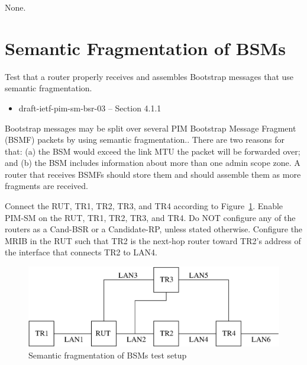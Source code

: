 \documentclass[11pt]{report}
\begin{document}
None.

\newpage
\section{Semantic Fragmentation of BSMs}

Test that a router properly receives and assembles Bootstrap messages that use
semantic fragmentation.


\begin{itemize}
  \item draft-ietf-pim-sm-bsr-03 -- Section 4.1.1
\end{itemize}

Bootstrap messages may be split over several PIM Bootstrap Message Fragment
(BSMF) packets by using semantic fragmentation.. There are two reasons for
that: (a) the BSM would exceed the link MTU the packet will be forwarded over;
and (b) the BSM includes information about more than one admin scope zone.
A router that receives BSMFs should store them and should assemble them as
more fragments are received.

Connect the RUT, TR1, TR2, TR3, and TR4 according to
Figure~\ref{fig:pim_test_6_7_semantic_fragmentation_of_bsms}.
Enable PIM-SM on the RUT, TR1, TR2, TR3, and TR4.
Do NOT configure any of the routers as a Cand-BSR or a Candidate-RP,
unless stated otherwise.
Configure the MRIB in the RUT such that TR2 is the next-hop router toward
TR2's address of the interface that connects TR2 to LAN4.


\begin{figure}[htbp]
  \begin{center}
    \includegraphics[scale=0.8]{figs/pim_test_6_7_semantic_fragmentation_of_bsms}
    \caption{Semantic fragmentation of BSMs test setup}
    \label{fig:pim_test_6_7_semantic_fragmentation_of_bsms}
  \end{center}
\end{figure}
\end{document}

